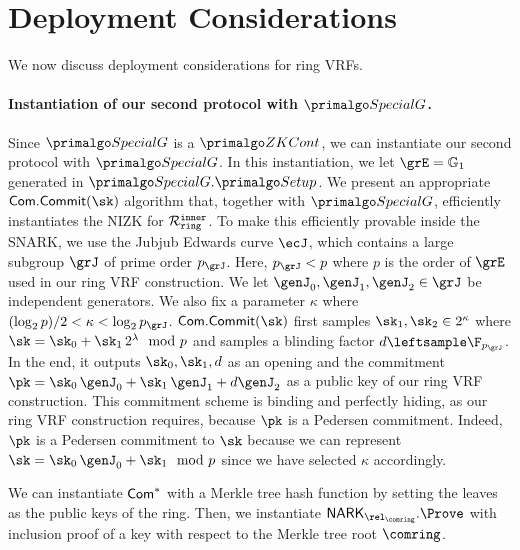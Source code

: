
\section{Deployment Considerations}\label{sec:deployment}

We now discuss deployment considerations for ring VRFs. 

\paragraph{Instantiation of our second protocol with $ \SpecialG $.} Since $ \SpecialG $ is a $ \ZKCont $, we can instantiate our second protocol with $ \SpecialG$. In this instantiation, we let $ \GG = \grone $ generated in $ \SpecialG.\Setup $.  
We present an appropriate $ \mathsf{Com}.\mathsf{Commit}(\sk) $ algorithm that, together with $ \SpecialG $, efficiently instantiates the NIZK for $ \mathcal{R}_{\mathtt{ring}}^{\mathtt{inner}} $. To make this efficiently provable inside the SNARK,  we use the Jubjub Edwards curve $\ecJ$, which contains a large subgroup $\grJ$ of prime order $p_\grJ$. Here, $p_\grJ < p$ where $ p $ is the order of $\grE$ used in our ring VRF construction. We let $\genJ_0,\genJ_1,\genJ_2 \in \grJ$ be independent generators. We also fix a parameter $ \kappa $ where $(\log_2 p)/2 < \kappa < \log_2 p_\grJ$. $ \mathsf{Com}.\mathsf{Commit}(\sk) $ first samples $\sk_1,\sk_2 \in 2^\kappa$  where $\sk = \sk_0 + \sk_1 \, 2^{\lambda} \mod p$ and samples a blinding factor $d \leftsample \F_{p_\grJ} $. In the end, it outputs $ \sk_0, \sk_1,d $ as an opening and the commitment $\pk=\sk_0\, \genJ_0 + \sk_1\, \genJ_1 + d \genJ_2$ as a public key of our ring VRF construction. This commitment scheme is binding and perfectly hiding, as our ring VRF construction requires, because $ \pk $ is a Pedersen commitment. Indeed, $\pk$ is a Pedersen commitment to $\sk$ because we can represent $ \sk = \sk_0\, \genJ_0 + \sk_1 \mod p$ since we have selected $ \kappa $ accordingly.

We can instantiate $ \mathsf{Com}^*$ with a Merkle tree hash function by setting the leaves as the public keys of the ring. Then, we instantiate $ \NARK_{\relcomring}.\Prove $ with inclusion proof of a key with respect to the Merkle tree root $ \comring $.

